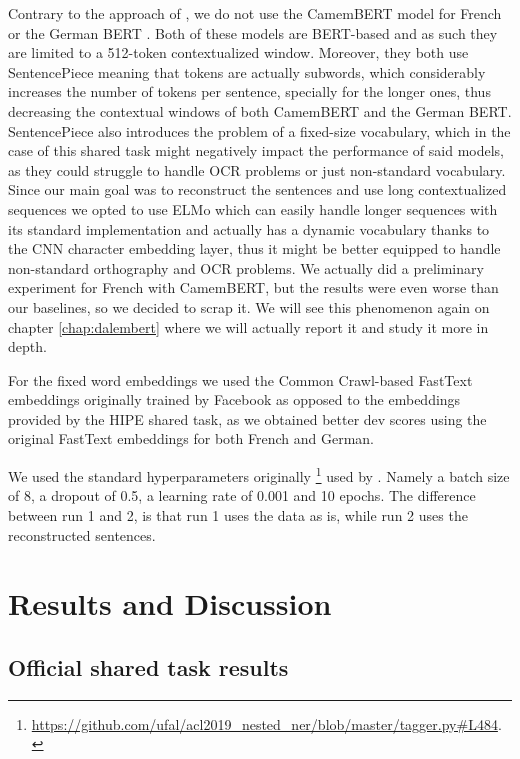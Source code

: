Contrary to the approach of \citet{ortiz-suarez-etal-2020-establishing}, we do not use the CamemBERT model \citep{martin-etal-2020-camembert} for French or the German BERT \citep{chan-etal-2019-german}. Both of these models are BERT-based and as such they are limited to a 512-token contextualized window. Moreover, they both use SentencePiece \citep{kudo-richardson-2018-sentencepiece} meaning that tokens are actually subwords, which considerably increases the number of tokens per sentence, specially for the longer ones, thus decreasing the contextual windows of both CamemBERT and the German BERT. SentencePiece also introduces the problem of a fixed-size vocabulary, which in the case of this shared task might negatively impact the performance of said models, as they could struggle to handle OCR problems or just non-standard vocabulary. Since our main goal was to reconstruct the sentences and use long contextualized sequences we opted to use ELMo which can easily handle longer sequences with its standard implementation and actually has a dynamic vocabulary thanks to the CNN character embedding layer, thus it might be better equipped to handle non-standard orthography and OCR problems. We actually did a preliminary experiment for French with CamemBERT, but the results were even worse than our baselines, so we decided to scrap it. We will see this phenomenon again on chapter \ref{chap:dalembert} where we will actually report it and study it more in depth.

For the fixed word embeddings we used the Common Crawl-based FastText embeddings \citep{grave-etal-2018-learning} originally trained by Facebook as opposed to the embeddings provided by the HIPE shared task, as we obtained better dev scores using the original FastText embeddings for both French and German.

We used the standard hyperparameters originally \footnote{\url{https://github.com/ufal/acl2019_nested_ner/blob/master/tagger.py\#L484}.} used by \citet{strakova-etal-2019-neural}. Namely a batch size of 8, a dropout of 0.5, a learning rate of 0.001 and 10 epochs. The difference between run 1 and 2, is that run 1 uses the data as is, while run 2 uses the reconstructed sentences.

\section{Results and Discussion}
\label{sec:results}

\subsection{Official shared task results}

